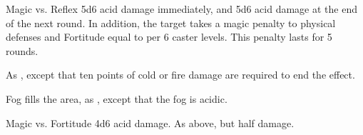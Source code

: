 \begin{spellheader}
\end{spellheader}
\begin{spellcontent}
    \begin{spelltargetinginfo}
    \end{spelltargetinginfo}
    \begin{spelleffects}
        \begin{spellattack}{Magic vs. Reflex}
            \spellsuccess 5d6 acid damage immediately, and 5d6 acid damage at the end of the next round. In addition, the target takes a magic penalty to physical defenses and Fortitude equal to   per 6 caster levels. This penalty lasts for 5 rounds.
        \end{spellattack}
    \end{spelleffects}
\end{spellcontent}
\begin{spellfooter}
    \spellnotes As , except that ten points of cold or fire damage are required to end the effect.
\end{spellfooter}

\begin{spellheader}
\end{spellheader}
\begin{spellcontent}
    \begin{spelltargetinginfo}
    \end{spelltargetinginfo}
    \begin{spelleffects}
        \spelleffect Fog fills the area, as , except that the fog is acidic.
        \spelldur{\durshort}
    \end{spelleffects}
\end{spellcontent}
\begin{spellsubcontent}
    \begin{spelltargetinginfo}
    \end{spelltargetinginfo}
    \begin{spelleffects}
        \begin{spellattack}{Magic vs. Fortitude}
            \spellsuccess 4d6 acid damage.
            \spellfailure As above, but half damage.
        \end{spellattack}
    \end{spelleffects}
\end{spellsubcontent}
\begin{spellfooter}
\end{spellfooter}

